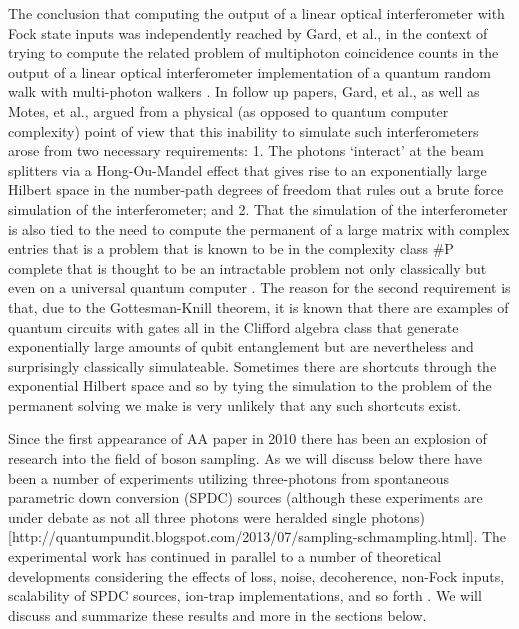 \documentclass[aps,pra,twocolumn,amsmath,amssymb,nofootinbib,superscriptaddress]{revtex4}
\begin{document}
	The conclusion that computing the output of a linear optical interferometer with Fock state inputs was independently reached by Gard, et al., in the context of trying to compute the related problem of multiphoton coincidence counts in the output of a linear optical interferometer implementation of a quantum random walk with multi-photon walkers \cite{gard2}. In follow up papers, Gard, et al., as well as Motes, et al., argued from a physical (as opposed to quantum computer complexity) point of view that this inability to simulate such interferometers arose from two necessary requirements: 1. The photons ‘interact’ at the beam splitters via a Hong-Ou-Mandel effect that gives rise to an exponentially large Hilbert space in the number-path degrees of freedom that rules out a brute force simulation of the interferometer; and 2. That the simulation of the interferometer is also tied to the need to compute the permanent of a large matrix with complex entries that is a problem that is known to be in the complexity class \#P complete that is thought to be an intractable problem not only classically but even on a universal quantum computer \cite{gard, motes}. The reason for the second requirement is that, due to the Gottesman-Knill theorem, it is known that there are examples of quantum circuits with gates all in the Clifford algebra class that generate exponentially large amounts of qubit entanglement but are nevertheless and surprisingly classically simulateable. Sometimes there are shortcuts through the exponential Hilbert space and so by tying the simulation to the problem of the permanent solving we make is very unlikely that any such shortcuts exist. 

	Since the first appearance of AA paper in 2010 there has been an explosion of research into the field of boson sampling. As we will discuss below there have been a number of experiments utilizing three-photons from spontaneous parametric down conversion (SPDC) sources (although these experiments are under debate as not all three photons were heralded single photons) \cite{ralph,broome,spring,anon,till,crespi} [http://quantumpundit.blogspot.com/2013/07/sampling-schmampling.html]. The experimental work has continued in parallel to a number of theoretical developments considering the effects of loss, noise, decoherence, non-Fock inputs, scalability of SPDC sources, ion-trap implementations, and so forth \cite{rohde1,rohde2,jiang,motes,shch}. We will discuss and summarize these results and more in the sections below. 
\end{document}
